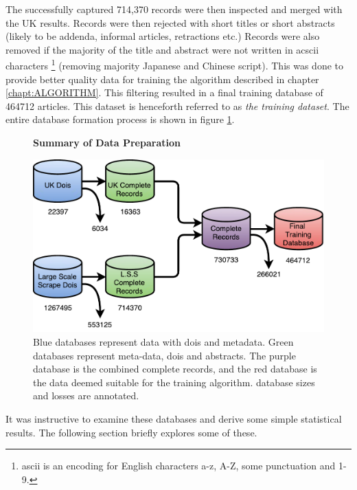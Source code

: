 The successfully captured 714,370 records were then inspected and merged with the UK results. Records were then rejected with short titles or short abstracts (likely to be addenda, informal articles, retractions etc.) Records were also removed if the majority of the title and abstract were not written in acscii characters \footnote{ascii is an encoding for English characters a-z, A-Z, some punctuation and 1-9.} (removing majority Japanese and Chinese script). This was done to provide better quality data for training the algorithm described in chapter \ref{chapt:ALGORITHM}. This filtering resulted in a final training database of 464712 articles. This dataset is henceforth referred to as \emph{the training dataset}. The entire database formation process is shown in figure \ref{fig:DATABASES}.
\begin{figure}[H]
    \centering
    \textbf{Summary of Data Preparation}\par\medskip
    \includegraphics[scale=0.6]{Data_Acquisition/Databases.pdf}
    \caption{Blue databases represent data with dois and metadata. Green databases represent meta-data, dois and abstracts. The purple database is the combined complete records, and the red database is the data deemed suitable for the training algorithm. database sizes and losses are annotated.}
     \label{fig:DATABASES}
\end{figure}


It was instructive to examine these databases and derive some simple statistical results. The following section briefly explores some of these.
